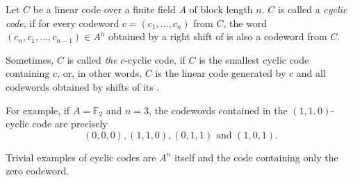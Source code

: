 \documentclass[12pt]{article}
\begin{document}
Let $C$ be a linear code over a finite field $A$ of block length $n$. $C$ is called a \emph{cyclic code}, if for every codeword $c=(c_1,\ldots,c_n)$ from $C$, the word $(c_n,c_1,\ldots,c_{n-1})\in A^n$ obtained by a  right shift of  is also a codeword from $C$.

Sometimes, $C$ is called \emph{the} $c$-cyclic code, if $C$ is the smallest cyclic code containing $c$, or, in other words, $C$ is the linear code generated by $c$ and all codewords obtained by  shifts of its .

For example, if $A=\mathbb{F}_2$ and $n=3$, the codewords contained in the $(1,1,0)$-cyclic code are precisely
$$(0,0,0), (1,1,0), (0,1,1)\text{ and }(1,0,1).$$

Trivial examples of cyclic codes are $A^n$ itself and the code containing only the zero codeword.
\end{document}
